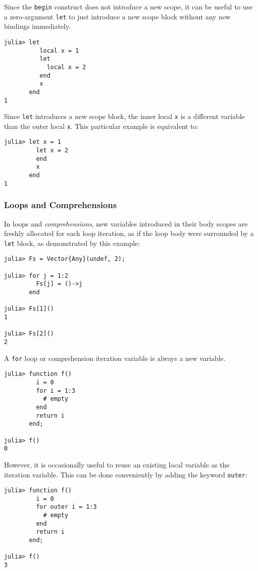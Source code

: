 \documentclass[
]{article}
\begin{document}
Since the \texttt{begin} construct does not introduce a new scope, it
can be useful to use a zero-argument \texttt{let} to just introduce a
new scope block without any new bindings immediately.

\begin{verbatim}
julia> let
          local x = 1
          let
            local x = 2
          end
          x
       end
1
\end{verbatim}

Since \texttt{let} introduces a new scope block, the inner local
\texttt{x} is a different variable than the outer local \texttt{x}. This
particular example is equivalent to:

\begin{verbatim}
julia> let x = 1
         let x = 2
         end
         x
       end
1
\end{verbatim}

\hypertarget{loops-and-comprehensions}{%
\subsubsection{Loops and
Comprehensions}\label{loops-and-comprehensions}}

In loops and \emph{comprehensions}, new variables introduced in their
body scopes are freshly allocated for each loop iteration, as if the
loop body were surrounded by a \texttt{let} block, as demonstrated by
this example:

\begin{verbatim}
julia> Fs = Vector{Any}(undef, 2);

julia> for j = 1:2
         Fs[j] = ()->j
       end

julia> Fs[1]()
1

julia> Fs[2]()
2
\end{verbatim}

A \texttt{for} loop or comprehension iteration variable is always a new
variable.

\begin{verbatim}
julia> function f()
         i = 0
         for i = 1:3
           # empty
         end
         return i
       end;

julia> f()
0
\end{verbatim}

However, it is occasionally useful to reuse an existing local variable
as the iteration variable. This can be done conveniently by adding the
keyword \texttt{outer}:

\begin{verbatim}
julia> function f()
         i = 0
         for outer i = 1:3
           # empty
         end
         return i
       end;

julia> f()
3
\end{verbatim}
\end{document}
